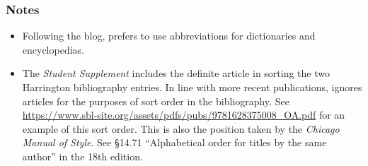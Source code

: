 \documentclass[a4paper]{article}
\begin{document}
\begin{verbcite}
  \nocite{NIDNTT, dahood:1965-1970, harrington:1986, harrington:1970, Jastrow,
    DMBI, mclay:2006, oday:intertextuality, vonrad:1990}
\end{verbcite}
\exampleabbreviations
\examplebibliography

\subsubsection{Notes}

\begin{itemize}
  \item Following the blog,  prefers to use abbreviations
    for dictionaries and encyclopedias.
  \item The \emph{Student Supplement} includes the definite article in sorting
    the two Harrington bibliography entries. In line with more recent
    publications,  ignores articles for the purposes of
    sort order in the bibliography. See
    \url{https://www.sbl-site.org/assets/pdfs/pubs/9781628375008_OA.pdf} for
    an example of this sort order. This is also the position taken by the
    \emph{Chicago Manual of Style}. See §14.71 “Alphabetical order for titles
    by the same author” in the 18th edition.
\end{itemize}
\end{document}
